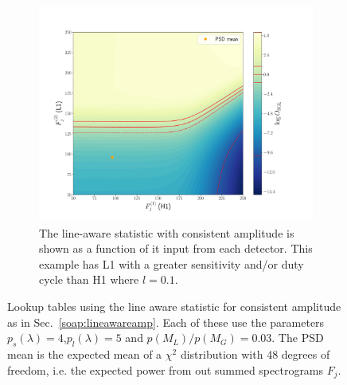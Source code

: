 \begin{figure}
\begin{subfigure}[h]{\linewidth}
\begin{minipage}{0.65\linewidth}
\includegraphics[width=0.9\columnwidth]{C3_soap/lookup_3d_0.pdf}
\end{minipage}\hfill
\begin{minipage}{0.35\linewidth}
\caption{The line-aware statistic with consistent amplitude is shown as a function of it input from each detector. This example has L1 with a greater sensitivity and/or duty cycle than H1 where $l=0.1$.}
\label{soap:lineawareamp:plot:linebig}
\end{minipage}
\end{subfigure}
\caption[Lookup tables for line aware statistic with consistent amplitude.]{Lookup tables using the line aware statistic for consistent amplitude as in Sec.~\ref{soap:lineawareamp}. Each of these use the parameters $p_s(\lambda) = 4$,$p_l(\lambda) = 5$ and $p(M_L)/p(M_G) = 0.03$. The \gls{PSD} mean is the expected mean of a $\chi^2$ distribution with 48 degrees of freedom, i.e. the expected power from out summed spectrograms $F_j$. }
\label{soap:lineawareamp:example}
\end{figure}

